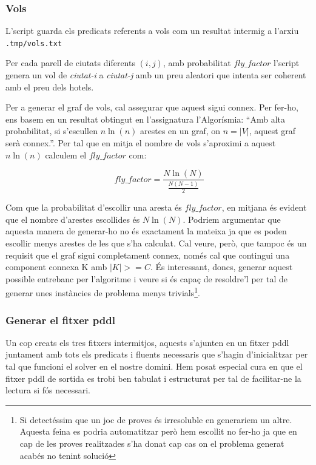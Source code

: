 \documentclass[11pt,a4paper]{article}
\begin{document}
\subsubsection*{Vols}

L'script guarda els predicats referents a vols com un resultat intermig a l'arxiu \texttt{.tmp/vols.txt}

Per cada parell de ciutats diferents $(i,j)$, amb probabilitat $fly\_factor$ l'script genera un vol de \emph{ciutat-i} a \emph{ciutat-j} amb un preu aleatori que intenta ser coherent amb el preu dels hotels. 

Per a generar el graf de vols, cal assegurar que aquest sigui connex. Per fer-ho, ens basem en un resultat obtingut en l'assignatura l'Algorísmia: ``Amb alta probabilitat, si s'escullen $n \ln(n)$ arestes en un graf, on $n=|V|$, aquest graf serà connex.''. Per tal que en mitja el nombre de vols s'aproximi a aquest $n \ln(n)$ calculem el $fly\_factor$ com:

\[
\ fly\_factor = \frac{N \ln(N)}{\frac{N (N-1)}{2}}
\]

Com que la probabilitat d'escollir una aresta és $fly\_factor$, en mitjana és evident que el nombre d'arestes escollides és $N\ln(N)$. Podriem argumentar que aquesta manera de generar-ho no és exactament la mateixa ja que es poden escollir menys arestes de les que s'ha calculat. Cal veure, però, que tampoc és un requisit que el graf sigui completament connex, només cal que contingui una component connexa K amb $|K| >= C$. És interessant, doncs, generar aquest possible entrebanc per l'algoritme i veure si és capaç de resoldre'l per tal de generar unes instàncies de problema menys trivials\footnote{Si detectéssim que un joc de proves és irresoluble en generariem un altre. Aquesta feina es podria automatitzar però hem escollit no fer-ho ja que en cap de les proves realitzades s'ha donat cap cas on el problema generat acabés no tenint solució}.

\subsubsection*{Generar el fitxer pddl}

Un cop creats els tres fitxers intermitjos, aquests s'ajunten en un fitxer pddl juntament amb tots els predicats i fluents necessaris que s'hagin d'inicialitzar per tal que funcioni el solver en el nostre domini. Hem posat especial cura en que el fitxer pddl de sortida es trobi ben tabulat i estructurat per tal de facilitar-ne la lectura si fós necessari.
\end{document}
